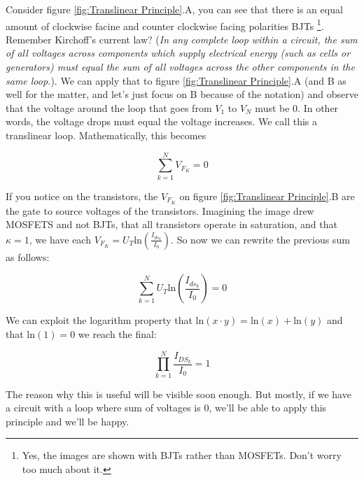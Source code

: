 Consider figure \ref{fig:Translinear Principle}.A, you can see that there is an equal amount of clockwise facine and counter clockwise facing polarities BJTs \footnote{Yes, the images are shown with BJTs rather than MOSFETs. Don't worry too much about it.}. Remember Kirchoff's current law? (\textit{In any complete loop within a circuit, the sum of all voltages across components which supply electrical energy (such as cells or generators) must equal the sum of all voltages across the other components in the same loop.}). We can apply that to figure \ref{fig:Translinear Principle}.A (and B as well for the matter, and let's just focus on B because of the notation) and observe that the voltage around the loop that goes from $V_{1}$ to $V_{N}$ must be 0. In other words, the voltage drops must equal the voltage increases. We call this a translinear loop. Mathematically, this becomes

\begin{equation}
    \sum_{k=1}^{N} V_{F_K} = 0
\end{equation}

If you notice on the transistors, the $V_{F_K}$  on figure \ref{fig:Translinear Principle}.B are the gate to source voltages of the transistors. Imagining the image drew MOSFETS and not BJTs, that all transistors operate in saturation, and that $\kappa = 1$, we have each $V_{F_K} = U_T \mathrm{ln}(\frac{I_{ds_k}}{I_0})$. So now we can rewrite the previous sum as follows: 

\begin{equation}
    \sum_{k=1}^{N} {U_T \mathrm{ln}(\frac{I_{ds_k}}{I_0})} = 0
\end{equation}

We can exploit the logarithm property that $\mathrm{ln}(x \cdot y) = \mathrm{ln}(x) + \mathrm{ln}(y)$ and that ln$(1) = 0$  we reach the final: 

\begin{equation}
    \prod_{k=1}^{N} \frac{I_{DS_k}}{I_0} = 1
\end{equation}

The reason why this is useful will be visible soon enough. But mostly, if we have a circuit with a loop where sum of voltages is 0, we'll be able to apply this principle and we'll be happy.


